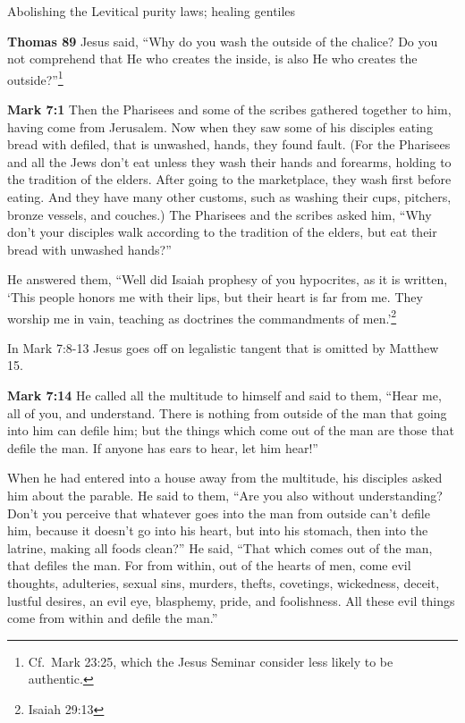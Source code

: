 \documentclass[10pt,twoside]{article} %
\newcommand{\quotesize}{\normalsize{}}
\newcommand{\comm}[1]{\begingroup \color{black!50} #1\endgroup}
\newenvironment{quotetext}{\begingroup\quotesize}{\endgroup}
\newcommand{\intex}[1]{\index[texts]{#1}}
\newcommand{\reftex}[1]{#1\intex{#1}}
\newcommand{\bible}[2]{\begin{quotetext}\textbf{#1}\intex{#1} #2\end{quotetext}}
\newcommand{\gospelmark}[2]{\bible{Mark #1}{#2}}
\newcommand{\thomas}[2]{\bible{Thomas #1}{#2}}
\begin{document}
\begin{section}{Abolishing the Levitical purity laws; healing gentiles}

\thomas{89}{
Jesus said, ``Why do you wash the outside of the chalice? Do you not comprehend that He who creates the inside, is also He who creates 
the outside?''\footnote{Cf.~Mark
23:25, which the Jesus Seminar consider less likely to be authentic.}
}

\gospelmark{7:1}{
 Then the Pharisees and some of the scribes gathered together to him, having come from Jerusalem.   Now when they saw some of his disciples eating bread with defiled, that is unwashed, hands, they found fault.   (For the Pharisees and all the Jews don't eat unless they wash their hands and forearms, holding to the tradition of the elders.
After going to the marketplace, they wash first before eating. And they have many other customs, such as washing
their cups, pitchers, bronze vessels, and couches.)   The Pharisees and the scribes asked him, ``Why don't your disciples walk according to the tradition of the elders, but eat their bread with unwashed hands?''


  He answered them, ``Well did Isaiah prophesy of you hypocrites, as it is written,
`This people honors me with their lips,
but their heart is far from me.
   They worship me in vain,
teaching as doctrines the commandments of men.'\footnote{\reftex{Isaiah 29:13}}}

\comm{In \reftex{Mark 7:8-13} Jesus goes off on legalistic tangent that is omitted by Matthew 15.}

\gospelmark{7:14}{
  He called all the multitude to himself and said to them, ``Hear me, all of you, and understand.    There is nothing from outside of the man that going into him can defile him; but the things which come out of the man are those that defile the man.    If anyone has ears to hear, let him hear!''

  When he had entered into a house away from the multitude, his disciples asked him about the parable.   He said to them, ``Are you also without understanding? Don't you perceive that whatever goes into the man from outside can't defile him,    because it doesn't go into his heart, but into his stomach, then into the latrine, making all foods clean?''   He said, ``That which comes out of the man, that defiles the man.    For from within, out of the hearts of men, come evil thoughts, adulteries, sexual sins, murders, thefts,    covetings, wickedness, deceit, lustful desires, an evil eye, blasphemy, pride, and foolishness.    All these evil things come from within and defile the man.''
}


\end{section}
\end{document}
